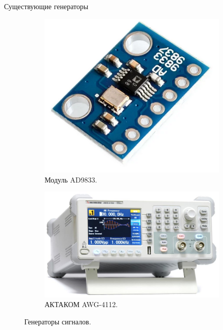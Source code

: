 \documentclass[10pt]{beamer}
\begin{document}
\begin{frame}{Существующие генераторы}
\begin{figure}
     \begin{subfigure}[H]{0.35\textwidth}
         \centering
         \includegraphics[width=\textwidth]{ad9833}
         \caption{Модуль AD9833.}
     \end{subfigure}
     \hfill
     \begin{subfigure}[H]{0.5\textwidth}
         \centering
         \includegraphics[width=\textwidth]{AWG-4112}
         \caption{АКТАКОМ AWG-4112.}
     \end{subfigure}
        \caption{Генераторы сигналов.}
\end{figure}
\end{frame}
\end{document}
